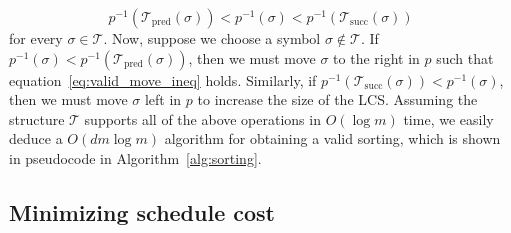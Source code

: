 \documentclass{article} %
\begin{document}
 \begin{equation}\label{eq:valid_move_ineq}
 	p^{-1}(\mathcal{T}_{\mathrm{pred}}(\sigma)) < p^{-1}(\sigma) < p^{-1}(\mathcal{T}_{\mathrm{succ}}(\sigma))
 \end{equation}
  for every $\sigma \in \mathcal{T}$. Now, suppose we choose a symbol $\sigma \notin \mathcal{T}$. If $p^{-1}(\sigma) < p^{-1}(\mathcal{T}_{\mathrm{pred}}(\sigma))$, then we must move $\sigma$ to the right in $p$ such that equation~\ref{eq:valid_move_ineq} holds. Similarly, if  $p^{-1}(\mathcal{T}_{\mathrm{succ}}(\sigma)) < p^{-1}(\sigma)$, then we must move $\sigma$ left in $p$ to increase the size of the LCS. Assuming the structure $\mathcal{T}$ supports all of the above operations in $O(\log m)$ time, we easily deduce a $O(d m\log m)$ algorithm for obtaining a valid sorting, which is shown in pseudocode in Algorithm~\ref{alg:sorting}.   
 
 
 
\subsection{Minimizing schedule cost}\label{sec:schedule_cost}
\end{document}
